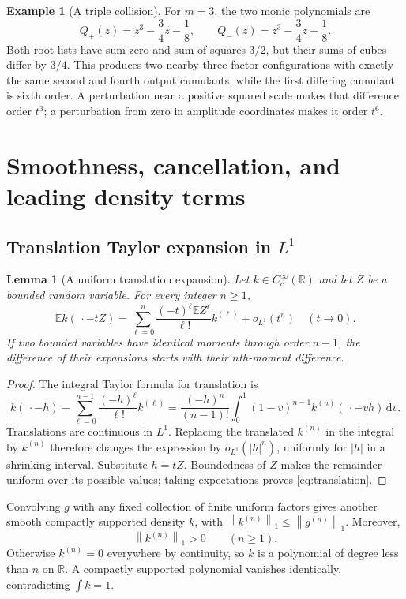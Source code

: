 \documentclass[11pt,a4paper]{article}
\numberwithin{equation}{section}
\newtheorem{lemma}[lemma]{Lemma}
\theoremstyle{definition}
\newtheorem{example}[example]{Example}
\theoremstyle{remark}
\newcommand{\R}{\mathbb R}
\newcommand{\E}{\mathbb E}
\newcommand{\dd}{\,\mathrm d}
\newcommand{\norm}[1]{\left\lVert#1\right\rVert}
\begin{document}
\begin{example}[A triple collision]
For $m=3$, the two monic polynomials are
\[
 Q_+(z)=z^3-\frac34z-\frac18,\qquad
 Q_-(z)=z^3-\frac34z+\frac18.
\]
Both root lists have sum zero and sum of squares $3/2$, but their sums of cubes
differ by $3/4$.  This produces two nearby three-factor configurations with
exactly the same second and fourth output cumulants, while the first differing
cumulant is sixth order.  A perturbation near a positive squared scale makes
that difference order $t^3$; a perturbation from zero in amplitude coordinates
makes it order $t^6$.
\end{example}

\section{Smoothness, cancellation, and leading density terms}
\label{sec:smoothness}

\subsection{Translation Taylor expansion in \texorpdfstring{$L^1$}{L1}}
\begin{lemma}[A uniform translation expansion]
\label{lem:translation}
Let $k\in C_c^\infty(\R)$ and let $Z$ be a bounded random variable.  For every
integer $n\ge1$,
\begin{equation}
 \E k(\,\cdot-tZ)
 =\sum_{\ell=0}^n\frac{(-t)^\ell\E Z^\ell}{\ell!}k^{(\ell)}
   +o_{L^1}(t^n)\quad(t\to0).
 \label{eq:translation}
\end{equation}
If two bounded variables have identical moments through order $n-1$, the
difference of their expansions starts with their $n$th-moment difference.
\end{lemma}
\begin{proof}
The integral Taylor formula for translation is
\[
 k(\,\cdot-h)-\sum_{\ell=0}^{n-1}\frac{(-h)^\ell}{\ell!}k^{(\ell)}
 =\frac{(-h)^n}{(n-1)!}\int_0^1(1-v)^{n-1}k^{(n)}(\,\cdot-vh)\dd v.
\]
Translations are continuous in $L^1$.  Replacing the translated $k^{(n)}$ in the
integral by $k^{(n)}$ therefore changes the expression by $o_{L^1}(|h|^n)$,
uniformly for $|h|$ in a shrinking interval.  Substitute $h=tZ$.  Boundedness of
$Z$ makes the remainder uniform over its possible values; taking expectations
proves \eqref{eq:translation}.
\end{proof}

Convolving $g$ with any fixed collection of finite uniform factors gives another
smooth compactly supported density $k$, with
$\norm{k^{(n)}}_1\le\norm{g^{(n)}}_1$.  Moreover,
\begin{equation}
 \norm{k^{(n)}}_1>0\qquad(n\ge1).
 \label{eq:nonzero-derivative}
\end{equation}
Otherwise $k^{(n)}=0$ everywhere by continuity, so $k$ is a polynomial of degree
less than $n$ on $\R$.  A compactly supported polynomial vanishes identically,
contradicting $\int k=1$.
\end{document}
